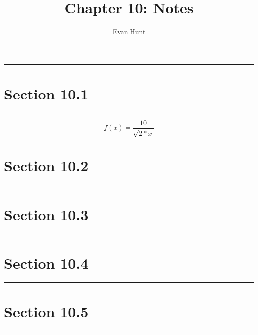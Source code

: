 \documentclass[12pt]{article}
\title{Chapter 10: Notes}
\author{Evan Hunt}
\begin{document}
    \maketitle

    \noindent\rule{\textwidth}{0.4pt}
    \section[]{Section 10.1}
    \noindent\rule{\textwidth}{0.4pt}
        \begin{equation}
            f(x) = \frac{10}{\sqrt{2*x}}
        \end{equation}
    \section[]{Section 10.2}
    \noindent\rule{\textwidth}{0.4pt}
    \section[]{Section 10.3}
    \noindent\rule{\textwidth}{0.4pt}
    \section[]{Section 10.4}
    \noindent\rule{\textwidth}{0.4pt}
    \section[]{Section 10.5}
    \noindent\rule{\textwidth}{0.4pt}
\end{document}
